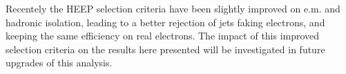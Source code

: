 Recentely the HEEP selection criteria have been slightly improved on e.m. and hadronic isolation, 
leading to a better rejection of jets faking electrons, and keeping the same efficiency on real electrons.
The impact of this improved selection criteria on the results here presented will be investigated in 
future upgrades of this analysis. 


 



